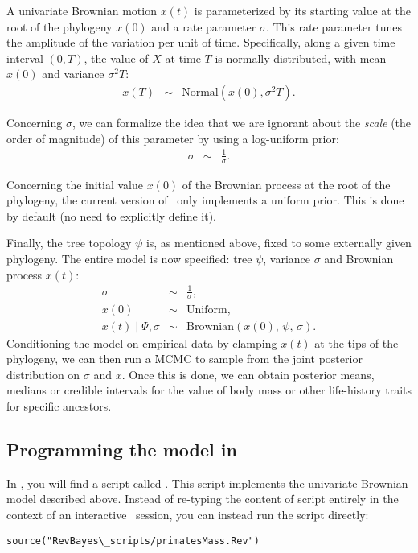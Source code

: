 A univariate Brownian motion $x(t)$ is parameterized by its starting value at the root of the phylogeny $x(0)$ and a rate parameter $\sigma$. This rate parameter tunes the amplitude of the variation per unit of time. Specifically, along a given time interval $(0,T)$, the value of $X$ at time $T$ is normally distributed, with mean $x(0)$ and variance $\sigma^2 T$:
\begin{eqnarray*}
x(T) &\sim& \text{Normal} \left( x(0), \sigma^2 T \right).
\end{eqnarray*}

Concerning $\sigma$, we can formalize the idea that we are ignorant about the \emph{scale} (the order of magnitude) of this parameter by using a log-uniform prior:
\begin{eqnarray*}
\sigma &\sim& \frac{1}{\sigma}.
\end{eqnarray*}

Concerning the initial value $x(0)$ of the Brownian process at the root of the phylogeny,
the current version of \RevBayes~only implements a uniform prior.
This is done by default (no need to explicitly define it).

Finally, the tree topology $\psi$ is, as mentioned above, fixed to some externally given phylogeny.
The entire model is now specified: tree $\psi$, variance $\sigma$ and Brownian process $x(t)$:
\begin{eqnarray*}
\sigma &\sim& \frac{1}{\sigma},
\\
x(0) &\sim& \text{Uniform},
\\
x(t) \mid \Psi, \sigma &\sim& \text{Brownian} \left( x(0), \, \psi, \, \sigma \right).
\end{eqnarray*}
Conditioning the model on empirical data by clamping $x(t)$ at the tips of the phylogeny, we can then run a MCMC to sample from the joint posterior distribution on $\sigma$ and $x$. Once this is done, we can obtain posterior means, medians or credible intervals for the value of body mass or other life-history traits for specific ancestors.


\subsection{Programming the model in \RevBayes}

In , you will find a script called .
This script implements the univariate Brownian model described above. Instead of re-typing the content of script entirely in the context of an interactive \RevBayes~session, you can instead run the script directly:
{\tt \small \begin{snugshade*}
\begin{lstlisting}
source("RevBayes\_scripts/primatesMass.Rev")
\end{lstlisting}
\end{snugshade*}}


